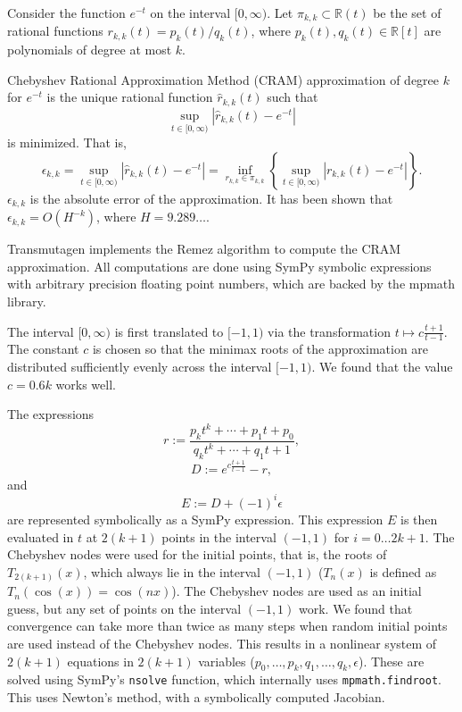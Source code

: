 Consider the function $e^{-t}$ on the interval $[0,\infty)$. Let
$\pi_{k,k}\subset \mathbb{R}(t)$ be the set of rational functions $r_{k,k}(t)
= p_k(t)/q_k(t)$, where $p_k(t), q_k(t)\in \mathbb{R}[t]$ are polynomials of
degree at most $k$.

Chebyshev Rational Approximation Method (CRAM) approximation of degree $k$
for $e^{-t}$ is the unique rational function $\hat{r}_{k,k}(t)$ such that
\begin{equation}
  \sup_{t\in[0, \infty)}|\hat{r}_{k, k}(t) - e^{-t}|
\end{equation}
is minimized. That is,
\begin{equation}
  \epsilon_{k,k} = \sup_{t\in[0, \infty)}|\hat{r}_{k, k}(t) - e^{-t}| = \inf_{r_{k,k}\in\pi_{k,k}}\left\{\sup_{t\in[0, \infty)}|r_{k, k}(t) - e^{-t}|\right\}.
\end{equation}
$\epsilon_{k,k}$ is the absolute error of the approximation. It has been shown
that $\epsilon_{k,k} = O(H^{-k})$, where $H=9.289\ldots$.

Transmutagen implements the Remez algorithm to compute the CRAM approximation.
All computations are done using SymPy symbolic expressions with arbitrary
precision floating point numbers, which are backed by the mpmath library.

The interval $[0, \infty)$ is first translated to $[-1, 1)$ via the
transformation $t\mapsto c\frac{t+1}{t-1}$.
The constant $c$ is chosen so that the minimax roots of the approximation are
distributed sufficiently evenly across the interval $[-1, 1)$. We found that
the value $c=0.6k$ works well.

The expressions
\begin{equation}
  r := \frac{p_kt^k + \cdots + p_1t + p_0}{q_kt^k + \cdots +
    q_1t + 1},
\end{equation}
\begin{equation}
  D := e^{c\frac{t+1}{t-1}} - r,
\end{equation}
and
\begin{equation}
  E := D + (-1)^i\epsilon
\end{equation}
are represented symbolically as a SymPy expression. This expression $E$ is then
evaluated in $t$ at $2(k + 1)$ points in the interval $(-1, 1)$ for $i=0\ldots
2k+1$. The Chebyshev nodes were used for the initial points, that
is, the roots of $T_{2(k +1)}(x)$, which always lie in the interval $(-1, 1)$
($T_n(x)$ is defined as $T_n(\cos(x)) = \cos(nx)$). The Chebyshev nodes are
used as an initial guess, but any set of points on the interval $(-1, 1)$
work. We found that convergence can take more than twice as many steps when
random initial points are used instead of the Chebyshev nodes. %
This results in a nonlinear system of $2(k+1)$ equations in $2(k+1)$ variables
($p_0,\ldots,p_k,q_1,\ldots,q_k,\epsilon$). These are solved using SymPy's
\texttt{nsolve} function, which internally uses \texttt{mpmath.findroot}. This
uses Newton's method, with a symbolically computed Jacobian.

